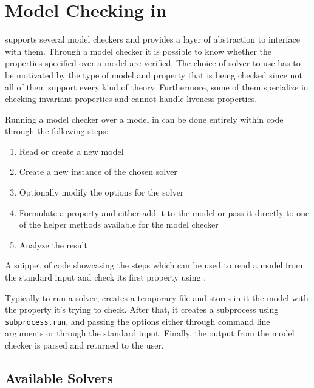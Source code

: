 \chapter{Model Checking in \pyvmt{}}
\label{ch:model-checking}
\pyvmt{} supports several model checkers and provides a layer of abstraction to interface with them. Through a model checker it is possible to know whether the properties specified over a model are verified.
The choice of solver to use has to be motivated by the type of model and property that is being checked since not all of them support every kind of theory.
Furthermore, some of them specialize in checking invariant properties and cannot handle liveness properties.

Running a model checker over a model in \pyvmt{} can be done entirely within \python{} code through the following steps:
\begin{enumerate}
    \item Read or create a new model
    \item Create a new instance of the chosen solver
    \item Optionally modify the options for the solver
    \item Formulate a property and either add it to the model or pass it directly to one of the helper methods available for the model checker
    \item Analyze the result
\end{enumerate}

\begin{listing}[h]
    \label{alg:model-checking-steps}
    \caption{A snippet of code showcasing the steps which can be used to read a model from the standard input and check its first property using \iceia{}.}
\end{listing}

Typically to run a solver, \pyvmt{} creates a temporary file and stores in it the model with the property it's trying to check.
After that, it creates a subprocess using \texttt{subprocess.run}, and passing the options either through command line arguments or through the standard input.
Finally, the output from the model checker is parsed and returned to the user.

\section{Available Solvers}

